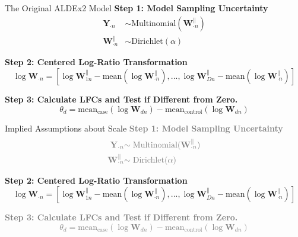 \documentclass[
  ignorenonframetext,
]{beamer}
\begin{document}
\begin{frame}{The Original ALDEx2 Model}
\protect\hypertarget{the-original-aldex2-model}{}
\textbf{Step 1: Model Sampling Uncertainty} \begin{align*}
\mathbf{Y}_{\cdot n} &\sim \text{Multinomial}(\mathbf{W}_{\cdot n}^\parallel)\\
\mathbf{W}_{\cdot n}^\parallel &\sim \text{Dirichlet}(\alpha)
\end{align*}

\textbf{Step 2: Centered Log-Ratio Transformation} \begin{equation*}
\log \mathbf{W}_{\cdot n} = \left[\log \mathbf{W}_{1n}^\parallel - \text{mean}(\log \mathbf{W}_{\cdot n}^\parallel), ..., \log \mathbf{W}_{Dn}^\parallel - \text{mean}(\log \mathbf{W}_{\cdot n}^\parallel) \right]
\end{equation*}

\textbf{Step 3: Calculate LFCs and Test if Different from Zero.}
\begin{equation*}
\theta_d = \text{mean}_{\text{case}}(\log \mathbf{W}_{dn}) - \text{mean}_{\text{control}}(\log \mathbf{W}_{dn})
\end{equation*}
\end{frame}

\begin{frame}{Implied Assumptions about Scale}
\protect\hypertarget{implied-assumptions-about-scale}{}
\textcolor{gray}{\textbf{Step 1: Model Sampling Uncertainty}}
\begin{align*}
\textcolor{gray}{\mathbf{Y}_{\cdot n}} &\textcolor{gray}{\sim \text{Multinomial}(\mathbf{W}_{\cdot n}^\parallel)}\\
\textcolor{gray}{\mathbf{W}_{\cdot n}^\parallel} &\textcolor{gray}{\sim \text{Dirichlet}(\alpha)}
\end{align*}

\textbf{Step 2: Centered Log-Ratio Transformation} \begin{equation*}
\log \mathbf{W}_{\cdot n} = \left[\log \mathbf{W}_{1n}^\parallel - \text{mean}(\log \mathbf{W}_{\cdot n}^\parallel), ..., \log \mathbf{W}_{Dn}^\parallel - \text{mean}(\log \mathbf{W}_{\cdot n}^\parallel) \right]
\end{equation*}

\textcolor{gray}{\textbf{Step 3: Calculate LFCs and Test if Different from Zero.}
\begin{equation*}
\theta_d = \text{mean}_{\text{case}}(\log \mathbf{W}_{dn}) - \text{mean}_{\text{control}}(\log \mathbf{W}_{dn})
\end{equation*}}
\end{frame}
\end{document}

